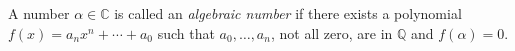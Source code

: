 \documentclass[12pt]{article}
\begin{document}
A number $\alpha \in \mathbb{C}$ is called an \emph{algebraic number} if there exists a polynomial $f(x) = a_n x^n + \cdots + a_0$ such that $a_0, \ldots , a_n$, not all zero, are in $\mathbb{Q}$ and $f(\alpha )=0$.
\end{document}
